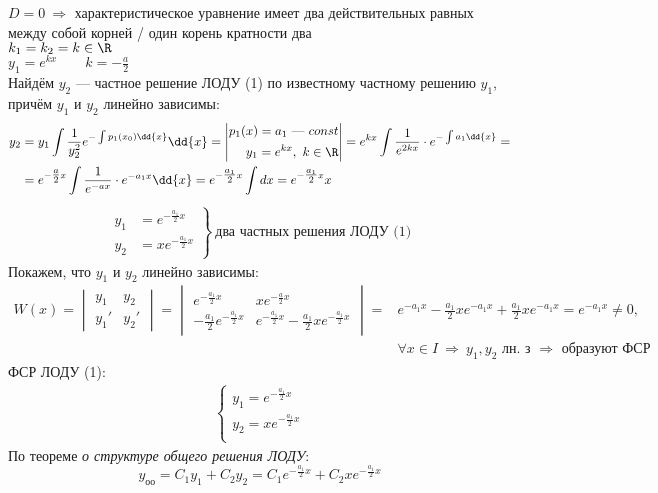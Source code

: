  $D = 0\ \Rightarrow$ характеристическое уравнение имеет два действительных равных между собой корней / один корень кратности два\\
$k_1 = k_2 = k \in \R$\\
$y_1 = e^{kx}\qquad k = -\frac{a}{2}$\\
Найдём $y_2$ --- частное решение ЛОДУ (1) по известному частному решению $y_1$, причём $y_1$ и $y_2$ линейно зависимы:
\begin{align*}
    y_2 &= y_1 \int \frac{1}{y^2_2} e^{-\int p_1(x_0) \dd{x}}\dd{x} = \left| \begin{aligned}
    p_1(x) = a_1 \text{ --- } const \\
    y_1 = e^{kx},\ k\in \R
    \end{aligned} \right| = e^{kx} \int \frac{1}{e^{2kx}} \cdot e^{-\int a_1\dd{x}} = \\
    &= e^{-\tfrac{a}{2}x} \int \frac{1}{e^{-ax}}\cdot e^{-a_1x}\dd{x} = e^{-\tfrac{a_1}{2}x} \int dx = e^{-\tfrac{a_1}{2}x}x
\end{align*}
\begin{gather*}
    \left.\begin{aligned}
        y_1 &= e^{-\tfrac{a_1}{2}x} \\
        y_2 &= xe^{-\tfrac{a_1}{2}x}
    \end{aligned}\right\}\ \text{два частных решения ЛОДУ (1)}
\end{gather*}
Покажем, что $y_1$ и $y_2$ линейно зависимы:
\begin{align*}
    W(x) = \begin{vmatrix}
        y_1 & y_2 \\
        y_1' & y_2'
    \end{vmatrix} = \begin{vmatrix}
        e^{-\tfrac{a_1}{2}x} & xe^{-\tfrac{a}{2}x} \\
        -\frac{a_1}{2} e^{-\tfrac{a_1}{2}x} & e^{-\tfrac{a_1}{2}x} - \frac{a_1}{2} x e^{-\tfrac{a_1}{2}x}
    \end{vmatrix} = & e^{-a_1x} - \frac{a_1}{2}x e^{-a_1x} + \frac{a_1}{2} x e^{-a_1x} = e^{-a_1x} \ne 0,\\
    & \forall x \in I\ \Rightarrow\ y_1, y_2 \text{ лн. з } \Rightarrow \text{ образуют ФСР } 
\end{align*}
ФСР ЛОДУ (1):
\begin{gather*}
    \left\{ \begin{aligned}
        y_1 = e^{-\tfrac{a_1}{2}x} \\
        y_2 = xe^{-\tfrac{a_1}{2}x} \\
    \end{aligned} \right.
\end{gather*}
По теореме \textit{о структуре общего решения ЛОДУ}:
\[
    y_{\text{оо}} = C_1y_1 + C_2y_2 = C_1 e^{-\tfrac{a_1}{2}x} + C_2 xe^{-\tfrac{a_1}{2}x}
\]


